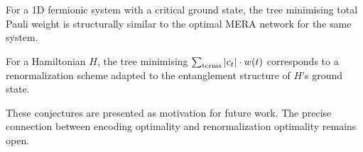\begin{conjecture}
\label{conj:mera}
For a 1D fermionic system with a critical ground state, the tree
minimising total Pauli weight is structurally similar to the optimal
MERA network for the same system.
\end{conjecture}

\begin{conjecture}
\label{conj:hamiltonian-adapted}
For a Hamiltonian $H$, the tree minimising
$\sum_{\text{terms}} |c_t| \cdot w\!\left(t\right)$ corresponds to a
renormalization scheme adapted to the entanglement structure of $H$'s
ground state.
\end{conjecture}

These conjectures are presented as motivation for future work.
The precise connection between encoding optimality and renormalization
optimality remains open.
